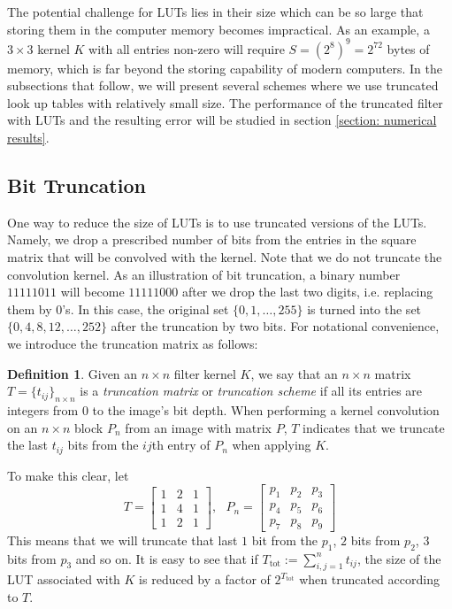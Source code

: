 \documentclass[12pt]{amsart}
\theoremstyle{definition}
\newtheorem{defn}[thm]{Definition}
\theoremstyle{remark}
\numberwithin{thm}{section}
\begin{document}
The potential challenge for LUTs lies in their size which can be so large that storing them in the computer memory becomes impractical. As an example, a $3\times 3$ kernel $K$ with all entries non-zero will require $S=(2^8)^9=2^{72}$ bytes of memory, which is far beyond the storing capability of modern computers. In the subsections that follow, we will present several schemes where we use truncated look up tables with relatively small size. The performance of the truncated filter with LUTs and the resulting error will be studied in section \ref{section: numerical results}. 

\subsection{Bit Truncation}\label{subsection:bit_truncation}
One way to reduce the size of LUTs is to use truncated versions of the LUTs. Namely, we drop a prescribed number of bits from the entries in the square matrix that will be convolved with the kernel. Note that we do not truncate the convolution kernel. As an illustration of bit truncation, a binary number $11111011$ will become $11111000$ after we drop the last two digits, i.e. replacing them by $0$'s. In this case, the original set $\{0,1,\dots,255\}$ is turned into the set $\{0,4,8,12,\dots,252\}$ after the truncation by two bits. For notational convenience, we introduce the truncation matrix as follows:

\begin{defn}\label{defn:truncation_matrix}
Given an $n\times n$ filter kernel $K$, we say that an $n\times n$ matrix $T= \{t_{ij}\}_{n\times n}$ is a \emph{truncation matrix} or \emph{truncation scheme} if all its entries are integers from 0 to the image's bit depth. When performing a kernel convolution on an $n\times n$ block $P_n$ from an image with matrix $P$, $T$ indicates that we truncate the last $t_{ij}$ bits from the $ij$th entry of $P_n$ when applying $K$. 
\end{defn}

To make this clear, let
$$
T=
\begin{bmatrix}
1 & 2& 1\\
1 & 4 & 1\\
1 & 2 &1
\end{bmatrix}, \ \ \ 
P_n=
\begin{bmatrix}
p_1 & p_2& p_3\\
p_4 & p_5 & p_6\\
p_7 & p_8 &p_9
\end{bmatrix}
$$
This means that we will truncate that last $1$ bit from the $p_1$, $2$ bits from $p_2$, $3$ bits from $p_3$ and so on. It is easy to see that if $T_\text{tot} := \sum_{i,j=1}^nt_{ij}$, the size of the LUT associated with $K$ is reduced by a factor of $2^{T_\text{tot}}$ when truncated according to $T$.
\end{document}
